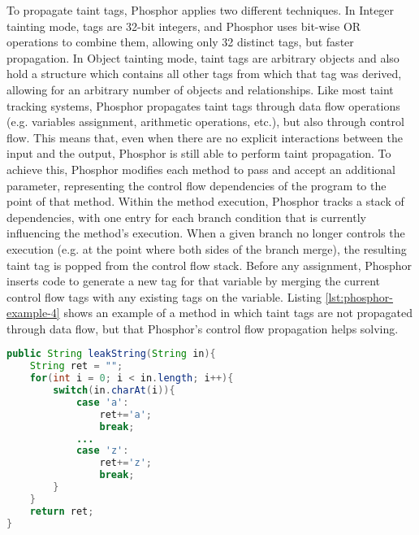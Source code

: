 To propagate taint tags, Phosphor applies two different techniques. In Integer tainting mode, tags are 32-bit integers, and Phosphor uses bit-wise OR operations to combine them, allowing only 32 distinct tags, but faster propagation. In Object tainting mode, taint tags are arbitrary objects and also hold a structure which contains all other tags from which that tag was derived, allowing for an arbitrary number of objects and relationships. Like most taint tracking systems, Phosphor propagates taint tags through data flow operations (e.g. variables assignment, arithmetic operations, etc.), but also through control flow. This means that, even when there are no explicit interactions between the input and the output, Phosphor is still able to perform taint propagation. To achieve this, Phosphor modifies each method to pass and accept an additional parameter, representing the control flow dependencies of the program to the point of that method. Within the
method execution, Phosphor tracks a stack of dependencies, with one entry for each branch condition that is currently influencing the method's execution. When a given branch no longer controls the execution (e.g. at the point where both sides of the
branch merge), the resulting taint tag is popped from the control flow stack. Before any assignment, Phosphor inserts code to generate a new tag for that variable by merging the current control flow tags with any existing tags on the variable. Listing \ref{lst:phosphor-example-4} shows an example of a method in which taint tags are not propagated through data flow, but that Phosphor's control flow propagation helps solving.

\begin{lstlisting}[language=Java,caption=Phosphor control flow example, label=lst:phosphor-example-4]
public String leakString(String in){
    String ret = "";
    for(int i = 0; i < in.length; i++){
        switch(in.charAt(i)){
            case 'a':
                ret+='a';
                break;
            ...
            case 'z':
                ret+='z';
                break;
        }
    }
    return ret;
}
\end{lstlisting}

